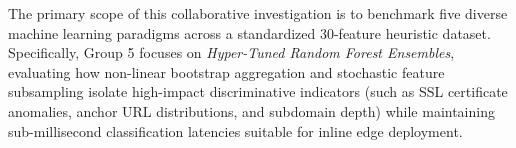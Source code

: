 The primary scope of this collaborative investigation is to benchmark five diverse machine learning paradigms across a standardized 30-feature heuristic dataset. Specifically, Group 5 focuses on \textit{Hyper-Tuned Random Forest Ensembles}, evaluating how non-linear bootstrap aggregation and stochastic feature subsampling isolate high-impact discriminative indicators (such as SSL certificate anomalies, anchor URL distributions, and subdomain depth) while maintaining sub-millisecond classification latencies suitable for inline edge deployment.
